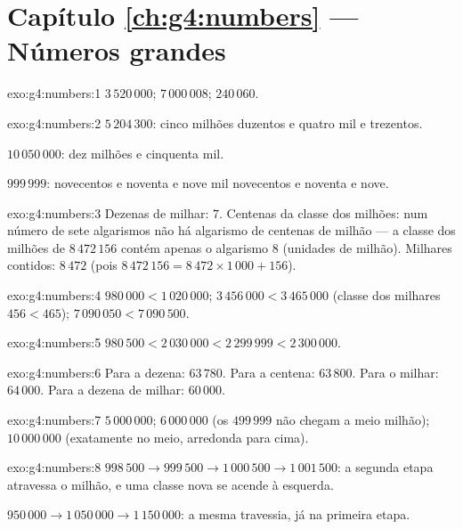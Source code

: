 \section*{Capítulo \ref{ch:g4:numbers} --- Números grandes}

\begin{solution}{exo:g4:numbers:1}
$3\,520\,000$; \quad $7\,000\,008$; \quad $240\,060$.
\end{solution}

\begin{solution}{exo:g4:numbers:2}
$5\,204\,300$: cinco milhões duzentos e quatro mil e trezentos.

$10\,050\,000$: dez milhões e cinquenta mil.

$999\,999$: novecentos e noventa e nove mil novecentos e noventa e
nove.
\end{solution}

\begin{solution}{exo:g4:numbers:3}
Dezenas de milhar: $7$. Centenas da classe dos milhões: num número de
sete algarismos não há algarismo de centenas de milhão --- a classe
dos milhões de $8\,472\,156$ contém apenas o algarismo $8$ (unidades
de milhão). Milhares contidos: $8\,472$ (pois
$8\,472\,156 = 8\,472 \times 1\,000 + 156$).
\end{solution}

\begin{solution}{exo:g4:numbers:4}
$980\,000 < 1\,020\,000$; \quad
$3\,456\,000 < 3\,465\,000$ (classe dos milhares $456 < 465$); \quad
$7\,090\,050 < 7\,090\,500$.
\end{solution}

\begin{solution}{exo:g4:numbers:5}
$980\,500 < 2\,030\,000 < 2\,299\,999 < 2\,300\,000$.
\end{solution}

\begin{solution}{exo:g4:numbers:6}
Para a dezena: $63\,780$. Para a centena: $63\,800$. Para o milhar:
$64\,000$. Para a dezena de milhar: $60\,000$.
\end{solution}

\begin{solution}{exo:g4:numbers:7}
$5\,000\,000$; \quad $6\,000\,000$ (os $499\,999$ não chegam a meio
milhão); \quad $10\,000\,000$ (exatamente no meio, arredonda para
cima).
\end{solution}

\begin{solution}{exo:g4:numbers:8}
$998\,500 \to 999\,500 \to 1\,000\,500 \to 1\,001\,500$: a segunda
etapa atravessa o milhão, e uma classe nova se acende à esquerda.

$950\,000 \to 1\,050\,000 \to 1\,150\,000$: a mesma travessia, já na
primeira etapa.
\end{solution}

